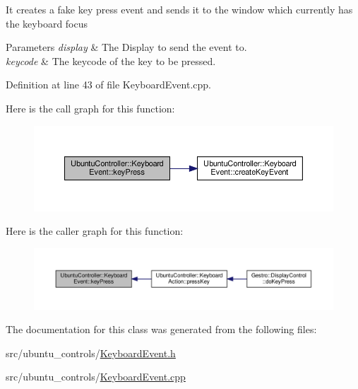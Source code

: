 It creates a fake key press event and sends it to the window which currently has the keyboard focus


\begin{DoxyParams}{Parameters}
{\em display} & The Display to send the event to. \\
\hline
{\em keycode} & The keycode of the key to be pressed. \\
\hline
\end{DoxyParams}


Definition at line 43 of file Keyboard\+Event.\+cpp.

Here is the call graph for this function\+:
\nopagebreak
\begin{figure}[H]
\begin{center}
\leavevmode
\includegraphics[width=350pt]{class_ubuntu_controller_1_1_keyboard_event_aea537f2a22fc1f162fd81b5d039eb053_cgraph}
\end{center}
\end{figure}
Here is the caller graph for this function\+:
\nopagebreak
\begin{figure}[H]
\begin{center}
\leavevmode
\includegraphics[width=350pt]{class_ubuntu_controller_1_1_keyboard_event_aea537f2a22fc1f162fd81b5d039eb053_icgraph}
\end{center}
\end{figure}


The documentation for this class was generated from the following files\+:\begin{DoxyCompactItemize}
\item 
src/ubuntu\+\_\+controls/\hyperlink{_keyboard_event_8h}{Keyboard\+Event.\+h}\item 
src/ubuntu\+\_\+controls/\hyperlink{_keyboard_event_8cpp}{Keyboard\+Event.\+cpp}\end{DoxyCompactItemize}
